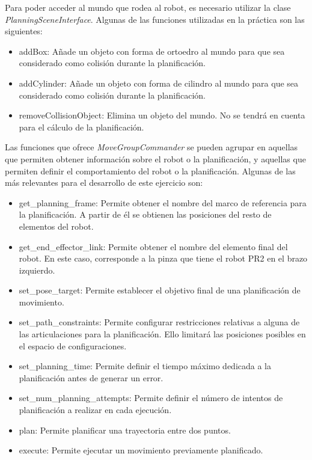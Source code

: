 \documentclass[12pt,spanish,chapterprefix, numbers=noenddot]{book}
\numberwithin{equation}{section}
\numberwithin{figure}{section}
\begin{document}
Para poder acceder al mundo que rodea al robot, es necesario utilizar la clase \textit{PlanningSceneInterface}. Algunas de las funciones utilizadas en la práctica son las siguientes: 
\begin{itemize}
\item addBox: Añade un objeto con forma de ortoedro al mundo para que sea considerado como colisión durante la planificación. 
\item addCylinder: Añade un objeto con forma de cilindro al mundo para que sea considerado como colisión durante la planificación. 
\item removeCollisionObject: Elimina un objeto del mundo. No se tendrá en cuenta para el cálculo de la planificación.  
\end{itemize}

Las funciones que ofrece \textit{MoveGroupCommander} \cite{movegroup} se pueden agrupar en aquellas que permiten obtener información sobre el robot o la planificación, y aquellas que permiten definir el comportamiento del robot o la planificación. 
Algunas de las más relevantes para el desarrollo de este ejercicio son: 
\begin{itemize}
\item get\_planning\_frame: Permite obtener el nombre del marco de referencia para la planificación. A partir de él se obtienen las posiciones del resto de elementos del robot. 
\item get\_end\_effector\_link: Permite obtener el nombre del elemento final del robot. En este caso, corresponde a la pinza que tiene el robot PR2 en el brazo izquierdo. 
\item set\_pose\_target: Permite establecer el objetivo final de una planificación de movimiento. 
\item set\_path\_constraints: Permite configurar restricciones relativas a alguna de las articulaciones para la planificación. Ello limitará las posiciones posibles en el espacio de configuraciones.
\item set\_planning\_time: Permite definir el tiempo máximo dedicada a la planificación antes de generar un error. 
\item set\_num\_planning\_attempts: Permite definir el número de intentos de planificación a realizar en cada ejecución.  
\item plan: Permite planificar una trayectoria entre dos puntos.  
\item execute: Permite ejecutar un movimiento previamente planificado. 
\end{itemize}
\end{document}
